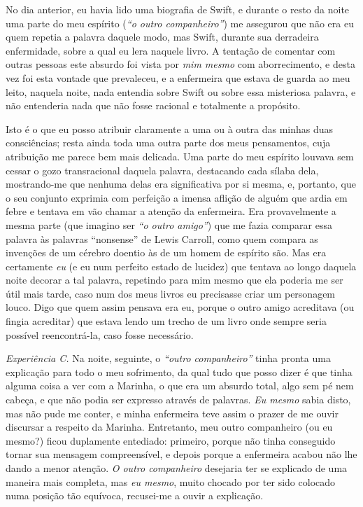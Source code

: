 No dia anterior, eu havia lido uma biografia de Swift, e durante o resto
da noite uma parte do meu espírito (\textit{“o outro companheiro”}) me
assegurou que não era eu quem repetia a palavra daquele modo, mas
Swift, durante sua derradeira enfermidade, sobre a qual eu lera naquele
livro.  A tentação de comentar com outras pessoas este absurdo foi
vista por \textit{mim mesmo} com aborrecimento, e desta vez foi esta
vontade que prevaleceu, e a enfermeira que estava de guarda ao meu
leito, naquela noite, nada entendia sobre Swift ou sobre essa
misteriosa palavra, e não entenderia nada que não fosse racional e
totalmente a propósito.  

Isto é o que eu posso atribuir claramente a uma ou à outra das minhas
duas consciências; resta ainda toda uma outra parte dos meus
pensamentos, cuja atribuição me parece bem mais delicada.  Uma parte do
meu espírito louvava sem cessar o gozo transracional daquela palavra,
destacando cada sílaba dela, mostrando-me que nenhuma delas era
significativa por si mesma, e, portanto, que o seu conjunto exprimia
com perfeição  a imensa aflição de alguém que ardia em febre e tentava
em vão chamar a atenção da enfermeira.  Era provavelmente a mesma parte
 (que imagino ser \textit{“o outro amigo”}) que me fazia comparar essa
palavra às palavras “nonsense” de Lewis Carroll, como quem compara as
invenções de um cérebro doentio às de um homem de espírito são.  Mas
era certamente \textit{eu} (e eu num perfeito estado de lucidez)  que
tentava ao longo daquela noite decorar a tal palavra, repetindo para
mim mesmo que ela poderia me ser útil mais tarde, caso num dos meus
livros eu precisasse criar um personagem louco.  Digo que quem assim
pensava era eu, porque o outro amigo acreditava (ou fingia acreditar) 
que estava lendo um trecho de um livro onde sempre seria possível
reencontrá-la, caso fosse necessário.

\textit{Experiência C.}  Na noite, seguinte, o \textit{“outro
companheiro”} tinha pronta uma explicação para todo o meu sofrimento,
da qual tudo que posso dizer é que tinha alguma coisa a ver com a
Marinha, o que era um absurdo total, algo sem pé nem cabeça, e que não
podia ser expresso através de palavras.  \textit{Eu mesmo} sabia disto,
mas não pude me conter, e minha enfermeira teve assim o prazer de me
ouvir discursar a respeito da Marinha.  Entretanto, meu outro
companheiro (ou eu mesmo?) ficou duplamente entediado: primeiro, porque
não tinha conseguido tornar sua mensagem compreensível, e depois porque
a enfermeira acabou não lhe dando a menor atenção.  \textit{O outro
companheiro} desejaria ter se explicado de uma maneira mais completa,
mas \textit{eu mesmo},\textit{ }muito chocado por ter sido colocado
numa posição tão equívoca, recusei-me a ouvir a explicação.  

